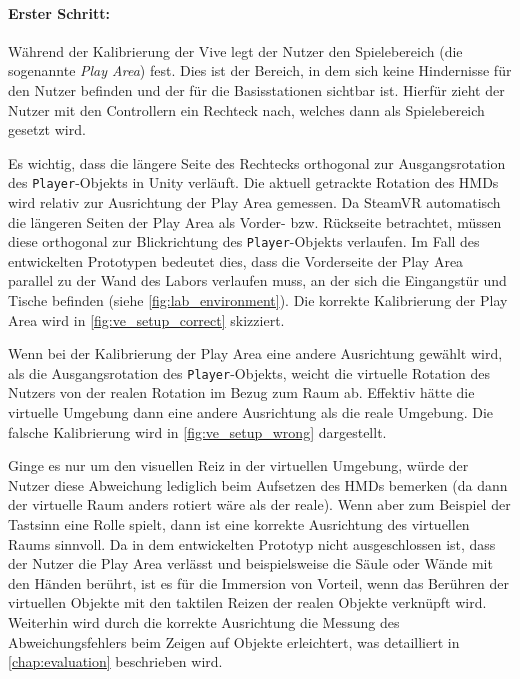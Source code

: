 \paragraph{Erster Schritt:}
Während der Kalibrierung der Vive legt der Nutzer den Spielebereich (die sogenannte \emph{Play Area}) fest.
Dies ist der Bereich, in dem sich keine Hindernisse für den Nutzer befinden und der für die Basisstationen sichtbar ist.
Hierfür zieht der Nutzer mit den Controllern ein Rechteck nach, welches dann als Spielebereich gesetzt wird.

Es wichtig, dass die längere Seite des Rechtecks orthogonal zur Ausgangsrotation des \texttt{Player}-Objekts in Unity verläuft.
Die aktuell getrackte Rotation des HMDs wird relativ zur Ausrichtung der Play Area gemessen.
Da SteamVR automatisch die längeren Seiten der Play Area als Vorder- bzw. Rückseite betrachtet, müssen diese orthogonal zur Blickrichtung des \texttt{Player}-Objekts verlaufen.
Im Fall des entwickelten Prototypen bedeutet dies, dass die Vorderseite der Play Area parallel zu der Wand des Labors verlaufen muss, an der sich die Eingangstür und Tische befinden (siehe \autoref{fig:lab_environment}).
Die korrekte Kalibrierung der Play Area wird in \autoref{fig:ve_setup_correct} skizziert.

Wenn bei der Kalibrierung der Play Area eine andere Ausrichtung gewählt wird, als die Ausgangsrotation des \texttt{Player}-Objekts, weicht die virtuelle Rotation des Nutzers von der realen Rotation im Bezug zum Raum ab.
Effektiv hätte die virtuelle Umgebung dann eine andere Ausrichtung als die reale Umgebung.
Die falsche Kalibrierung wird in \autoref{fig:ve_setup_wrong} dargestellt.

Ginge es nur um den visuellen Reiz in der virtuellen Umgebung, würde der Nutzer diese Abweichung lediglich beim Aufsetzen des HMDs bemerken (da dann der virtuelle Raum anders rotiert wäre als der reale).
Wenn aber zum Beispiel der Tastsinn eine Rolle spielt, dann ist eine korrekte Ausrichtung des virtuellen Raums sinnvoll.
Da in dem entwickelten Prototyp nicht ausgeschlossen ist, dass der Nutzer die Play Area verlässt und beispielsweise die Säule oder Wände mit den Händen berührt, ist es für die Immersion von Vorteil, wenn das Berühren der virtuellen Objekte mit den taktilen Reizen der realen Objekte verknüpft wird.
Weiterhin wird durch die korrekte Ausrichtung die Messung des Abweichungsfehlers beim Zeigen auf Objekte erleichtert, was detailliert in \autoref{chap:evaluation} beschrieben wird.

